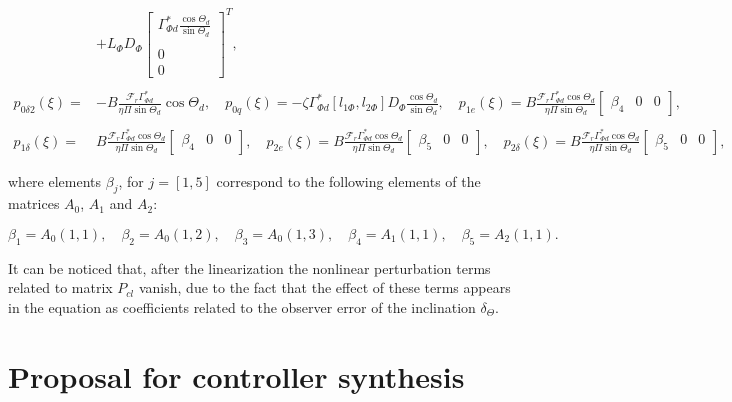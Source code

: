 \documentclass[main.tex]{subfiles}
\begin{document}
\begin{align}
		&+ L_\Phi D_\Phi\begin{bmatrix}\Gamma_{\Phi d}^*\frac{\cos \Theta_d}{\sin \Theta_d} \\\\0\\0\end{bmatrix}^T, \nonumber	\\
		\nonumber \\
		p_{0\delta 2}(\xi) =& -B\frac{\mathcal{F}_r \Gamma_{\Phi d}^*}{\eta \Pi \sin \Theta_d}\cos \Theta_d, \quad
		p_{0q}(\xi)= -\zeta \Gamma_{\Phi d}^* [l_{1\Phi},l_{2\Phi}]D_\Phi\frac{\cos \Theta_d}{\sin \Theta_d}, \quad p_{1e}(\xi) = B\frac{\mathcal{F}_r \Gamma_{\Phi d}^* \cos \Theta_d}{\eta \Pi \sin \Theta_d}\begin{bmatrix}\beta_4 & 0 & 0\end{bmatrix}, \nonumber \\
		\nonumber \\
		p_{1\delta}(\xi) =& B\frac{\mathcal{F}_r \Gamma_{\Phi d}^* \cos \Theta_d}{\eta \Pi \sin \Theta_d}\begin{bmatrix}\beta_4& 0 & 0\end{bmatrix}, \quad p_{2e}(\xi) = B\frac{\mathcal{F}_r \Gamma_{\Phi d}^* \cos \Theta_d}{\eta \Pi \sin \Theta_d}\begin{bmatrix}\beta_5& 0 & 0\end{bmatrix}, \quad p_{2\delta}(\xi) = B\frac{\mathcal{F}_r \Gamma_{\Phi d}^* \cos \Theta_d}{\eta \Pi \sin \Theta_d}\begin{bmatrix}\beta_5& 0 & 0\end{bmatrix}, \nonumber 		
	\end{align}
	
	where elements $\beta_j$, for $j = [1,5]$ correspond to the following elements of the matrices $A_0$, $A_1$ and $A_2$:
	
	\begin{equation*}
		\beta_1 = A_0(1,1), \quad \beta_2 = A_0(1,2), \quad \beta_3 = A_0(1,3), \quad \beta_4 = A_1(1,1), \quad \beta_5 = A_2(1,1).
	\end{equation*}
	
	It can be noticed that, after the linearization the nonlinear perturbation terms related to matrix $P_{cl}$ vanish, due to the fact that the effect of these terms appears in the equation as coefficients related to the observer error of the inclination $\delta_\Theta$.
	
	\newpage
	\section{Proposal for controller synthesis}
	
\end{document}

